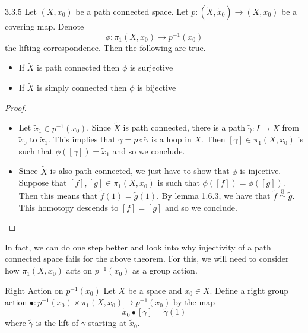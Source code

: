 \documentclass[a4paper]{article}
\begin{document}
\begin{thm}{}{3.3.5} Let $(X,x_0)$ be a path connected space. Let $p:(\tilde{X},\tilde{x}_0)\to(X,x_0)$ be a covering map. Denote $$\phi:\pi_1(X,x_0)\to p^{-1}(x_0)$$ the lifting correspondence. Then the following are true. 
\begin{itemize}
\item If $\tilde{X}$ is path connected then $\phi$ is surjective
\item If $\tilde{X}$ is simply connected then $\phi$ is bijective
\end{itemize}\tcbline
\begin{proof}~\\
\begin{itemize}
\item Let $\tilde{x}_1\in p^{-1}(x_0)$. Since $\tilde{X}$ is path connected, there is a path $\tilde{\gamma}:I\to X$ from $\tilde{x}_0$ to $\tilde{x}_1$. This implies that $\gamma=p\circ\tilde{\gamma}$ is a loop in $X$. Then $[\gamma]\in\pi_1(X,x_0)$ is such that $\phi([\gamma])=\tilde{x}_1$ and so we conclude. 
\item Since $\tilde{X}$ is also path connected, we just have to show that $\phi$ is injective. Suppose that $[f],[g]\in\pi_1(X,x_0)$ is such that $\phi([f])=\phi([g])$. Then this means that $\tilde{f}(1)=\tilde{g}(1)$. By lemma 1.6.3, we have that $\tilde{f}\overset{\partial}{\simeq}\tilde{g}$. This homotopy descends to $[f]=[g]$ and so we conclude. 
\end{itemize}
\end{proof}
\end{thm}

In fact, we can do one step better and look into why injectivity of a path connected space fails for the above theorem. For this, we will need to consider how $\pi_1(X,x_0)$ acts on $p^{-1}(x_0)$ as a group action. 

\begin{defn}{Right Action on $p^{-1}(x_0)$}{} Let $X$ be a space and $x_0\in X$. Define a right group action $\bullet:p^{-1}(x_0)\times\pi_1(X,x_0)\to p^{-1}(x_0)$ by the map $$\tilde{x}_0\bullet[\gamma]=\tilde{\gamma}(1)$$ where $\tilde{\gamma}$ is the lift of $\gamma$ starting at $\tilde{x}_0$. 
\end{defn}
\end{document}
